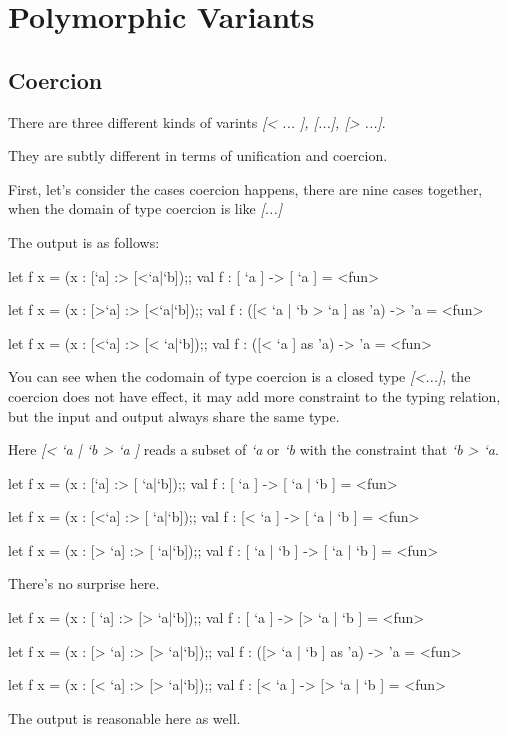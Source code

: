 \section{Polymorphic Variants}

\subsection{Coercion}
There are three different kinds of varints \textit{[< ... ], [...], [>
  ...]}.

They are subtly different in terms of unification and coercion.

First, let's consider the cases coercion happens, there are nine cases
together, when the domain of type coercion is like \textit{[...]}

The output is as follows:

\begin{ocamlcode}
let f x = (x : [`a] :> [<`a|`b]);;
val f : [ `a ] -> [ `a ] = <fun>

let f x = (x : [>`a] :> [<`a|`b]);;
val f : ([< `a | `b > `a ] as 'a) -> 'a = <fun>

let f x = (x : [<`a] :> [< `a|`b]);;
val f : ([< `a ] as 'a) -> 'a = <fun>
\end{ocamlcode}
You can see when the codomain of type coercion is a closed type
\textit{[<...]}, the coercion does not have effect, it may add more
constraint to the typing relation, but the input and output always
share the same type.

Here \textit{[< `a | `b > `a ]} reads a subset of \textit{`a} or
\textit{`b} with the constraint that \textit{`b > `a}.


\begin{ocamlcode}
let f x = (x : [`a] :> [ `a|`b]);;
val f : [ `a ] -> [ `a | `b ] = <fun>

let f x = (x : [<`a] :> [ `a|`b]);;
val f : [< `a ] -> [ `a | `b ] = <fun>

let f x = (x : [> `a] :> [ `a|`b]);;
val f : [ `a | `b ] -> [ `a | `b ] = <fun>  
\end{ocamlcode}

There's no surprise here.

\begin{ocamlcode}
let f x = (x : [ `a] :> [> `a|`b]);;
val f : [ `a ] -> [> `a | `b ] = <fun>

let f x = (x : [> `a] :> [> `a|`b]);;
val f : ([> `a | `b ] as 'a) -> 'a = <fun>

let f x = (x : [< `a] :> [> `a|`b]);;
val f : [< `a ] -> [> `a | `b ] = <fun>
\end{ocamlcode}
The output is reasonable here as well.

